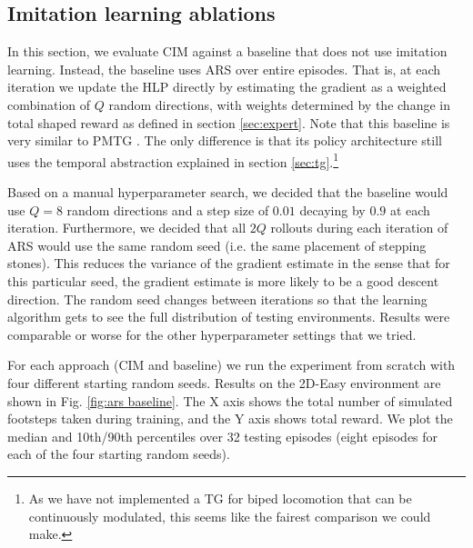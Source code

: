 \documentclass[conference]{IEEEtran}
\begin{document}

\subsection{Imitation learning ablations}

In this section, we evaluate CIM against a baseline that does not use imitation learning.
Instead, the baseline uses ARS \citep{mania2018simple} over entire episodes.
That is, at each iteration we update the HLP directly by estimating the gradient as a weighted combination of $Q$ random directions,
with weights determined by the change in total shaped reward as defined in section \ref{sec:expert}.
Note that this baseline is very similar to PMTG \citep{iscen2018pmtg}.
The only difference is that its policy architecture still uses the temporal abstraction explained in section \ref{sec:tg}.\footnote{
As we have not implemented a TG for biped locomotion that can be continuously modulated, this seems like the fairest comparison we could make.}

Based on a manual hyperparameter search, we decided that the baseline would use $Q=8$ random directions and a step size of $0.01$ decaying by $0.9$ at each iteration.
Furthermore, we decided that all $2Q$ rollouts during each iteration of ARS would use the same random seed (i.e. the same placement of stepping stones).
This reduces the variance of the gradient estimate in the sense that for this particular seed, the gradient estimate is more likely to be a good descent direction.
The random seed changes between iterations so that the learning algorithm gets to see the full distribution of testing environments.
Results were comparable or worse for the other hyperparameter settings that we tried.

For each approach (CIM and baseline) we run the experiment from scratch with four different starting random seeds.
Results on the 2D-Easy environment are shown in Fig. \ref{fig:ars baseline}.
The X axis shows the total number of simulated footsteps taken during training, and the Y axis shows total reward.
We plot the median and 10th/90th percentiles over 32 testing episodes (eight episodes for each of the four starting random seeds).
\end{document}
